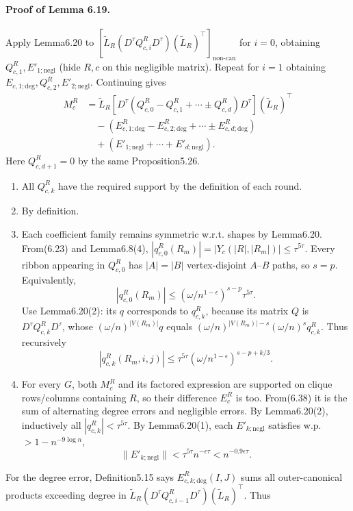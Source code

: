 \paragraph{Proof of Lemma 6.19.} Apply Lemma6.20 to $[\widetilde L_R(D^\tau Q_{c,i}^R D^\tau)(\widetilde L_R)^\top]_{\mathrm{non\text{-}can}}$ for $i=0$, obtaining $Q_{c,1}^R,E'_{1;\mathrm{negl}}$ (hide $R,c$ on this negligible matrix). Repeat for $i=1$ obtaining $E_{c,1;\mathrm{deg}},Q_{c,2}^R,E'_{2;\mathrm{negl}}$. Continuing gives
\begin{align*}M_c^R&=\widetilde L_R[D^\tau(Q_{c,0}^R-Q_{c,1}^R+\cdots\pm Q_{c,d}^R)D^\tau](\widetilde L_R)^\top\\&\quad-(E_{c,1;\mathrm{deg}}^R-E_{c,2;\mathrm{deg}}^R+\cdots\pm E_{c,d;\mathrm{deg}}^R)\\&\quad+(E'_{1;\mathrm{negl}}+\cdots+E'_{d;\mathrm{negl}}).\tag{6.38}\end{align*}
Here $Q_{c,d+1}^R=0$ by the same Proposition5.26.
\begin{enumerate}\item All $Q_{c,k}^R$ have the required support by the definition of each round.
\item By definition.
\item Each coefficient family remains symmetric w.r.t. shapes by Lemma6.20. From(6.23) and Lemma6.8(4), $|q_{c,0}^R(R_m)|=|Y_c(|R|,|R_m|)|\le\tau^{5\tau}$. Every ribbon appearing in $Q_{c,0}^R$ has $|A|=|B|$ vertex-disjoint $A$--$B$ paths, so $s=p$. Equivalently,
\[|q_{c,0}^R(R_m)|\le(\omega/n^{1-\epsilon})^{s-p}\tau^{5\tau}.\tag{6.39}\]
Use Lemma6.20(2): its $q$ corresponds to $q_{c,k}^R$, because its matrix $Q$ is $D^\tau Q_{c,k}^R D^\tau$, whose $(\omega/n)^{|V(R_m)|}q$ equals $(\omega/n)^{|V(R_m)|-s}(\omega/n)^s q_{c,k}^R$. Thus recursively
\[|q_{c,k}^R(R_m,i,j)|\le\tau^{5\tau}(\omega/n^{1-\epsilon})^{s-p+k/3}.\]
\item For every $G$, both $M_c^R$ and its factored expression are supported on clique rows/columns containing $R$, so their difference $E_c^R$ is too. From(6.38) it is the sum of alternating degree errors and negligible errors. By Lemma6.20(2), inductively all $|q_{c,k}^R|<\tau^{5\tau}$. By Lemma6.20(1), each $E'_{k;\mathrm{negl}}$ satisfies w.p. $>1-n^{-9\log n}$,
\[\|E'_{k;\mathrm{negl}}\|<\tau^{5\tau}n^{-\epsilon\tau}<n^{-0.9\epsilon\tau}.\]
\end{enumerate}
For the degree error, Definition5.15 says $E_{c,k;\mathrm{deg}}^R(I,J)$ sums all outer-canonical products exceeding degree in $\widetilde L_R(D^\tau Q_{c,i-1}^R D^\tau)(\widetilde L_R)^\top$. Thus
